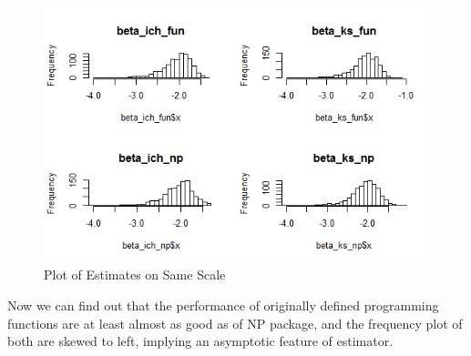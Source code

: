 \documentclass[a4paper]{article}
\begin{document}
\begin{figure}[h!]
  \caption{Plot of Estimates on Same Scale}
  \includegraphics[width=\linewidth]{compare_done.png}
 
  \label{fig:plot of estimates on same scale}
\end{figure}

Now we can find out that the performance of originally defined programming functions are at least almost as good as of NP package, and the frequency plot of both are skewed to left, implying an asymptotic feature of estimator.
\end{document}
